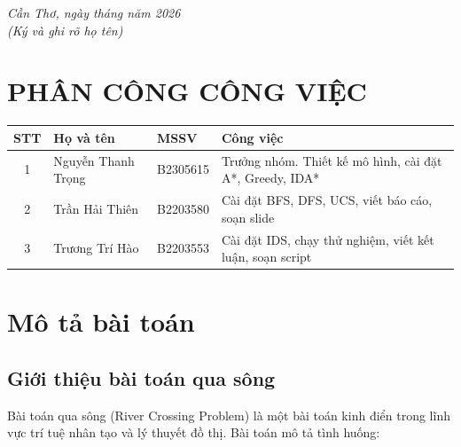 \documentclass[a4paper,12pt]{article}
\begin{document}
\hfill\textit{Cần Thơ, ngày \quad tháng \quad năm 2026}\\[0.3cm]
\hfill\textit{(Ký và ghi rõ họ tên)}\\[3cm]

\newpage
\tableofcontents
\newpage

\section*{PHÂN CÔNG CÔNG VIỆC}

\begin{table}[H]
\centering
\begin{tabular}{@{}clll@{}}
\toprule
\textbf{STT} & \textbf{Họ và tên} & \textbf{MSSV} & \textbf{Công việc} \\
\midrule
1 & Nguyễn Thanh Trọng & B2305615 &
    Trưởng nhóm. Thiết kế mô hình, cài đặt A*, Greedy, IDA* \\
2 & Trần Hải Thiên & B2203580 &
    Cài đặt BFS, DFS, UCS, viết báo cáo, soạn slide \\
3 & Trương Trí Hào & B2203553 &
    Cài đặt IDS, chạy thử nghiệm, viết kết luận, soạn script \\
\bottomrule
\end{tabular}
\end{table}

\section{Mô tả bài toán}

\subsection{Giới thiệu bài toán qua sông}

Bài toán qua sông (River Crossing Problem) là một bài toán kinh điển trong lĩnh vực trí tuệ nhân tạo và lý thuyết đồ thị. Bài toán mô tả tình huống:
\end{document}
